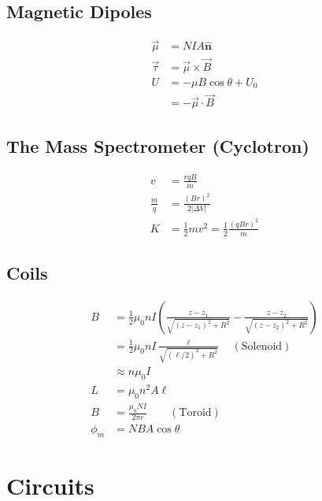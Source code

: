 \documentclass[10pt]{article}
\newcommand{\buvec}[1]{\hat{\mathbf{#1}}}
\begin{document}
\begin{multicols*}{5}
\subsection{Magnetic Dipoles}

\begin{align*}
    \vec{\mu} &= NIA \buvec{n}\\
    \vec{\tau} &= \vec{\mu} \times \vec{B}\\
    U &= -\mu B \cos \theta + U_0\\
      &= -\vec{\mu} \cdot \vec{B}
\end{align*}

\subsection{The Mass Spectrometer (Cyclotron)}

\begin{align*}
    v &= \frac{rqB}{m}\\
    \frac{m}{q} &= \frac{(Br)^2}{2 |\Delta V|}\\
    K &= \frac{1}{2} m v^2 = \frac{1}{2}
    \frac{\left({qBr}\right)^2}{m}
\end{align*}

\subsection{Coils}

\begin{align*}
    B &= \frac{1}{2} \mu_0 nI \left({\frac{z-z_1}{\sqrt{(z-z_1)^2 +
	    R^2}} - \frac{z-z_2}{\sqrt{(z-z_2)^2 + R^2}}}\right)\\
      &= \frac{1}{2} \mu_0 nI \frac{\ell}{\sqrt{(\ell/2)^2 + R^2}}
	  \quad (\text{Solenoid})\\
      &\approx n\mu_0 I\\
    L &= \mu_0 n^2 A \ell\\
    B &= \frac{\mu_0NI}{2\pi r} \qquad (\text{Toroid})\\
    \phi_m &= NBA \cos \theta
\end{align*}

\section{Circuits}


\end{multicols*}
\end{document}
